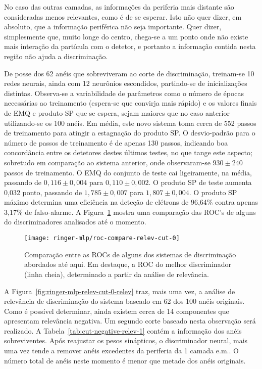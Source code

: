 No caso das outras camadas, as informações da periferia mais distante são
consideradas menos relevantes, como é de se esperar. Isto não quer dizer, em
absoluto, que a informação periférica não seja importante. Quer dizer,
simplesmente que, muito longe do centro, chega-se a um ponto onde não existe
mais interação da partícula com o detetor, e portanto a informação contida
nesta região não ajuda a discrimina\c{c}ão.

De posse dos 62 anéis que sobreviveram ao corte de discriminação, treinam-se
10 redes neurais, ainda com 12 neurônios escondidos, partindo-se de
inicializações distintas. Observa-se a variabilidade de parâmetros como o
número de épocas necessárias ao treinamento (espera-se que convirja mais
rápido) e os valores finais de EMQ e produto SP que se espera, sejam maiores
que no caso anterior utilizando-se os 100 anéis. Em média, este novo sistema
toma cerca de 552 passos de treinamento para atingir a estagnação do produto
SP. O desvio-padrão para o número de passos de treinamento é de apenas 130
passos, indicando boa concordância entre os detetores destes últimos testes,
no que tange este aspecto; sobretudo em comparação ao sistema anterior, onde
observaram-se $930\pm240$ passos de treinamento. O EMQ do conjunto de teste
cai ligeiramente, na média, passando de $0,116\pm0,004$ para
$0,110\pm0,002$. O produto SP de teste aumenta 0,032 ponto, passando de
$1,785\pm0,007$ para $1,807\pm0,004$. O produto SP máximo determina uma
eficiência na deteção de elétrons de 96,64\% contra apenas 3,17\% de
falso-alarme. A Figura~\ref{fig:ringer-mlp-relev-cut-0-roc} mostra uma
comparação das ROC's de alguns do discriminadores analisados até o momento.

\begin{figure}
\begin{center}
\texttt{[image: ringer-mlp/roc-compare-relev-cut-0]}
\end{center}
\caption{Comparação entre as ROCs de alguns dos sistemas de discriminação
abordados até aqui. Em destaque, a ROC do melhor discriminador (linha cheia),
determinado a partir da análise de relevância.}
\label{fig:ringer-mlp-relev-cut-0-roc}
\end{figure}

A Figura~\ref{fig:ringer-mlp-relev-cut-0-relev} traz, mais uma vez, a análise
de relevância de discriminação do sistema baseado em 62 dos 100 anéis
originais. Como é possível determinar, ainda existem cerca de 14 componentes
que apresentam relevância negativa. Um segundo corte baseado nesta observação
será realizado. A Tabela~\ref{tab:cut-negative-relev-1} contém a informação
dos anéis sobreviventes. Após reajustar os pesos sinápticos, o discriminador
neural, mais uma vez tende a remover anéis excedentes da periferia da 1\eira
camada e.m.. O número total de anéis neste momento é menor que metade dos
anéis originais.

